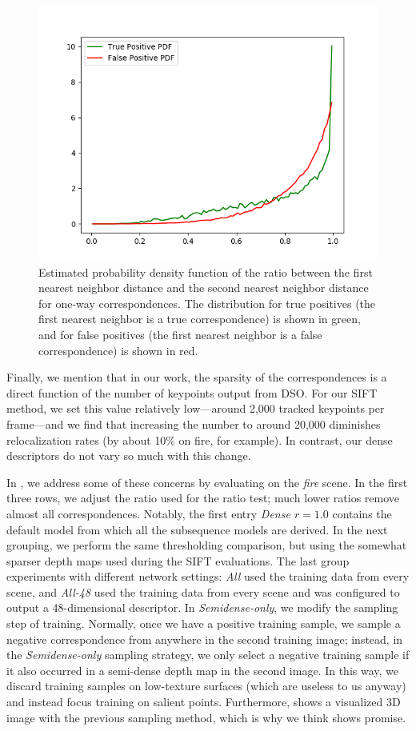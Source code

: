 \begin{figure}[h]
	\centering
	\includegraphics[width=0.8\linewidth]{experiments/tpfp_pdf.png}
	\caption{Estimated probability density function of the ratio between the first nearest neighbor distance and the second nearest neighbor distance for one-way correspondences. The distribution for true positives (the first nearest neighbor is a true correspondence) is shown in green, and for false positives (the first nearest neighbor is a false correspondence) is shown in red.}
	\label{fig:tpfp_pdf}
\end{figure}

Finally, we mention that in our work, the sparsity of the correspondences is a direct function of the number of keypoints output from DSO. For our SIFT method, we set this value relatively low---around 2,000 tracked keypoints per frame---and we find that increasing the number to around 20,000 diminishes relocalization rates (by about 10\% on fire, for example). In contrast, our dense descriptors do not vary so much with this change.

In , we address some of these concerns by evaluating on the \textit{fire} scene. In the first three rows, we adjust the ratio used for the ratio test; much lower ratios remove almost all correspondences. Notably, the first entry \textit{Dense $r=1.0$} contains the default model from which all the subsequence models are derived. In the next grouping, we perform the same thresholding comparison, but using the somewhat sparser depth maps used during the SIFT evaluations. The last group experiments with different network settings: \textit{All} used the training data from every scene, and \textit{All-48} used the training data from every scene and was configured to output a 48-dimensional descriptor. In \textit{Semidense-only}, we modify the sampling step of training. Normally, once we have a positive training sample, we sample a negative correspondence from anywhere in the second training image; instead, in the \textit{Semidense-only} sampling strategy, we only select a negative training sample if it also occurred in a semi-dense depth map in the second image. In this way, we discard training samples on low-texture surfaces (which are useless to us anyway) and instead focus training on salient points. Furthermore,  shows a visualized 3D image with the previous sampling method, which is why we think shows promise.

